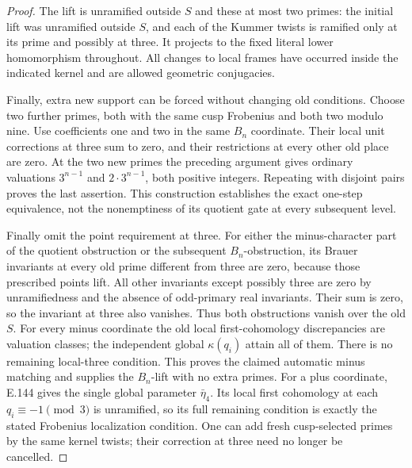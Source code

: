 \begin{proof}
The lift is unramified outside \(S\) and these
at most two primes: the initial lift was
unramified outside \(S\), and each of the
Kummer twists is ramified only at its prime
and possibly at three.
It projects to the fixed literal lower
homomorphism throughout.
All changes to local frames have occurred
inside the indicated kernel and are allowed
geometric conjugacies.

Finally, extra new support can be forced
without changing old conditions.
Choose two further primes, both with the
same cusp Frobenius and both two modulo nine.
Use coefficients one and two in the same
\(B_n\) coordinate.
Their local unit corrections at three sum
to zero, and their restrictions at every
other old place are zero.
At the two new primes the preceding argument
gives ordinary valuations \(3^{n-1}\) and
\(2\cdot3^{n-1}\), both positive integers.
Repeating with disjoint pairs proves the
last assertion. This construction establishes
the exact one-step equivalence, not the
nonemptiness of its quotient gate at every
subsequent level.

Finally omit the point requirement at three.
For either the minus-character part of the
quotient obstruction or the subsequent
\(B_n\)-obstruction, its Brauer invariants
at every old prime different from three
are zero, because those prescribed points
lift. All other invariants except possibly
three are zero by unramifiedness and the
absence of odd-primary real invariants.
Their sum is zero, so the invariant at
three also vanishes. Thus both obstructions
vanish over the old \(S\).
For every minus coordinate the old local
first-cohomology discrepancies are valuation
classes; the independent global
\(\kappa(q_i)\) attain all of them.
There is no remaining local-three condition.
This proves the claimed automatic minus
matching and supplies the \(B_n\)-lift with
no extra primes. For a plus coordinate,
E.144 gives the single global parameter
\(\bar\eta_4\). Its local first cohomology
at each \(q_i\equiv-1\pmod3\) is unramified,
so its full remaining condition is exactly
the stated Frobenius localization condition.
One can add fresh cusp-selected primes by
the same kernel twists; their correction
at three need no longer be cancelled.
\end{proof}
